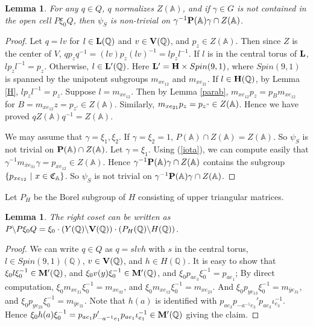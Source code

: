 \documentclass[11pt]{amsart}
\numberwithin{equation}{section}
\newtheorem{lemma}[theorem]{Lemma}
\theoremstyle{definition}
\begin{document}
\begin{lemma}\label{lem1} For any $q\in Q$, $q$ normalizes $Z({\mathbb{A}})$, and if $\gamma\in G$ is not contained in the open cell $P\xi_0 Q$, then $\psi_S$ is non-trivial on $\gamma^{-1}\bold P({\mathbb{A}})\gamma\cap Z({\mathbb{A}})$.
\end{lemma}
\begin{proof} Let $q=lv$ for $l\in \bold{L}({\mathbb{Q}})$ and $v\in \bold V({\mathbb{Q}})$, and $p_z\in Z({\mathbb{A}})$. Then since $Z$ is the center of $V$, 
$qp_zq^{-1}=(lv)p_z(lv)^{-1}=lp_zl^{-1}$.
If $l$ is in the central torus of $\bold{L}$, $lp_zl^{-1}=p_z$. Otherwise, $l\in \bold L'({\mathbb{Q}})$. Here $\bold L'=\bold H\times Spin(9,1)$, 
where $Spin(9,1)$ is spanned by the unipotent subgroups $m_{x e_{12}}$ and $m_{x e_{21}}$. 
If $l\in \bold H({\mathbb{Q}})$, by Lemma \ref{H}, $lp_zl^{-1}=p_z$.
Suppose $l=m_{xe_{12}}$. Then by Lemma \ref{parab},
$m_{xe_{12}}p_z=p_B m_{xe_{12}}$ for $B=m_{xe_{12}}z=p_{z'}\in Z({\mathbb{A}})$. Similarly, $m_{xe_{21}}p_z=p_{z"}\in Z({\mathbb{A}})$.
Hence we have proved $qZ({\mathbb{A}})q^{-1}=Z({\mathbb{A}})$.

We may assume that $\gamma=\xi_1, \xi_2$. If $\gamma=\xi_2=1$, $P({\mathbb{A}})\cap Z({\mathbb{A}})=Z({\mathbb{A}})$. So $\psi_S$ is not trivial on $\bold P({\mathbb{A}})\cap Z({\mathbb{A}})$.
Let $\gamma=\xi_1$. Using (\ref{iota}), we can compute easily that $\gamma^{-1} m_{\bar xe_{31}}\gamma= p_{xe_{12}}\in Z({\mathbb{A}})$. Hence $\gamma^{-1}\bold P({\mathbb{A}})\gamma\cap Z({\mathbb{A}})$ contains the subgroup $\{p_{xe_{12}}\ |\ x\in \frak C_{\mathbb{A}}\}$. So $\psi_S$ is not trivial on $\gamma^{-1}\bold P({\mathbb{A}})\gamma\cap Z({\mathbb{A}})$.
\end{proof}
Let $P_H$ be the Borel subgroup of $H$ consisting of upper triangular matrices. 
\begin{lemma}\label{lem2} The right coset can be written as 
$P\backslash P\xi_0 Q=\xi_0 \cdot (Y({\mathbb{Q}})\backslash \bold V({\mathbb{Q}}))\cdot (P_H({\mathbb{Q}})\backslash H({\mathbb{Q}}))$. 
\end{lemma}
\begin{proof} We can write $q\in Q$ as $q=slvh$ with $s$ in the central torus, $l\in Spin(9,1)({\mathbb{Q}})$, $v\in \bold V({\mathbb{Q}})$, and 
$h\in H({\mathbb{Q}})$.
It is easy to show that $\xi_0 l\xi_0^{-1}\in \bold{M}'({\mathbb{Q}})$, and $\xi_0 v(y) \xi_0^{-1}\in  \bold{M}'({\mathbb{Q}})$, and 
$\xi_0 p_{ae_3} \xi_0^{-1}=p_{ae_1}$;
By direct computation, $\xi_0 m_{x e_{21}}\xi_0^{-1}=m_{x e_{32}}$, and $\xi_0 m_{x e_{12}}\xi_0^{-1}=m_{x e_{23}}$.
And $\xi_0 p_{ye_{13}}\xi_0^{-1}=m_{\bar y e_{31}}$, and $\xi_0 p_{ye_{23}}\xi_0^{-1}=m_{\bar y e_{21}}$.
Note that $h(a)$ is identified with $p_{ae_3}p_{-a^{-1}e_3}'p_{ae_3}\iota_{e_3}^{-1}$. Hence 
$\xi_0 h(a)\xi_0^{-1}=p_{ae_1}p_{-a^{-1}e_1}'p_{ae_1}\iota_{e_1}^{-1}\in  \bold{M}'({\mathbb{Q}})$ giving the claim.
\end{proof}
\end{document}
